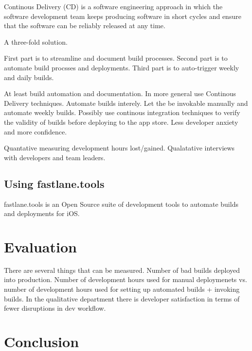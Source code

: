 \documentclass{ituthesis}
\begin{document}
Continous Delivery (CD) is a software engineering approach in which the software development team keeps producing software in short cycles and ensure that the software can be reliably released at any time. 

A three-fold solution.

First part is to streamline and document build processes.
Second part is to automate build procsses and deployments.
Third part is to auto-trigger weekly and daily builds.



At least build automation and documentation. In more general use Continous Delivery techniques. Automate builds interely. Let the be invokable manually and automate weekly builds. Possibly use continous integration techniques to verify the validity of builds before deploying to the app store. Less developer anxiety and more confidence.

Quantative measuring development hours lost/gained. Qualatative interviews with developers and team leaders.

\section{Using fastlane.tools}

fastlane.tools is an Open Source suite of development tools to automate builds and deployments for iOS. \cite{Krause2015}

\chapter{Evaluation}

There are several things that can be measured. Number of bad builds deployed into production. Number of development hours used for manual deploymenets vs. number of development hours used for setting up automated builds + invoking builds. In the qualitative department there is developer satisfaction in terms of fewer disruptions in dev workflow. 

\chapter{Conclusion}

\clearpage

\renewcommand{\bibname}{References}

\end{document}
